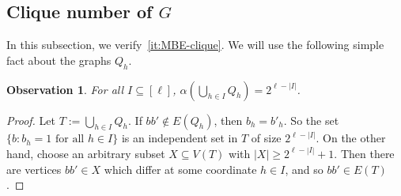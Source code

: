 \documentclass[10pt,a4paper]{article}
\newtheorem{observation}[theorem]{Observation}
\theoremstyle{definition}
\newcommand{\sS}{\mathsf{S}}
\begin{document}






\subsection{Clique number of $G$}
In this subsection, we verify~\ref{it:MBE-clique}. We will use the following simple fact about the graphs $Q_h$.
\begin{observation}\label{obs-indset}
	For all $I \subseteq [\ell]$, $\alpha\left(\bigcup_{h \in I}Q_h\right)=2^{\ell-|I|}$. %
\end{observation}

\begin{proof}
	Let $T := \bigcup_{h \in I}Q_h$.
	If $bb' \notin E(Q_h)$, then $b_h= b'_h$. So the set $\{ b : b_h = 1 \text{ for all }h \in I\}$ is an independent set in $T$ of size $2^{\ell-|I|}$.
	On the other hand, choose an arbitrary subset  $X \subseteq V(T)$ with $|X| \geq 2^{\ell-|I|}+1$.
	Then there are vertices $bb' \in X$ which differ at some coordinate $h \in I$, and so $bb' \in E(T)$.
\end{proof}


\end{document}
